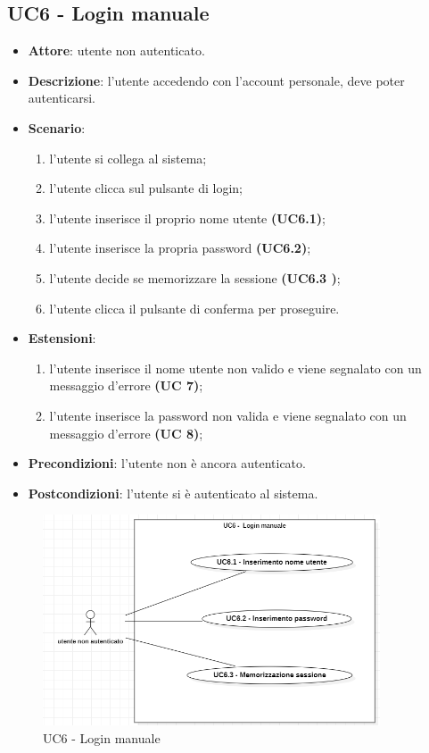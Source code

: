 \subsection{UC6 - Login manuale}

\begin{itemize}
    \item \textbf{Attore}: utente non autenticato.
    \item \textbf{Descrizione}: l'utente accedendo con l'account personale, deve poter autenticarsi.
    \item \textbf{Scenario}:
    \begin{enumerate}
        \item l'utente si collega al sistema;
        \item l'utente clicca sul pulsante di login;
        \item l'utente inserisce il proprio nome utente \textbf{(UC6.1)};
        \item l'utente inserisce la propria password \textbf{(UC6.2)};
        \item l'utente decide se memorizzare la sessione \textbf{(UC6.3 )};
        \item l'utente clicca il pulsante di conferma per proseguire.
    \end{enumerate}
    \item \textbf{Estensioni}:
        \begin{enumerate}
            \item l'utente inserisce il nome utente non valido e viene segnalato con un messaggio d'errore \textbf{(UC 7)};
            \item l'utente inserisce la password non valida e viene segnalato con un messaggio d'errore \textbf{(UC 8)};
        \end{enumerate}

    \item \textbf{Precondizioni}: l'utente non è ancora autenticato.
    \item \textbf{Postcondizioni}: l'utente si è autenticato al sistema.
\end{itemize}

\begin{figure}[!h]
    \includegraphics[width=10cm]{sezioni/Images/UC6-Manuale.png}
    \centering
    \caption{UC6 - Login manuale}
\end{figure}

